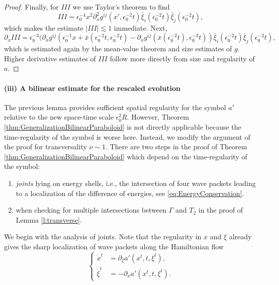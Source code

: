 \documentclass{amsart}
\theoremstyle{definition}
\begin{document}
\begin{proof}
Finally, for $III$ we use Taylor's theorem to find
\begin{equation*}
III = \epsilon_0^{-4} x^2 \partial^2_x g^{ij}(x',\epsilon_0^{-2}t ) \bar{\xi}_i(\epsilon_0^{-2} t) \bar{\xi}_j(\epsilon_0^{-2} t),
\end{equation*}
which makes the estimate $|III| \lesssim 1$ immediate. Next,
\begin{equation*}
\partial_x III = \epsilon_0^{-3} ( \partial_x g^{ij}(\epsilon_0^{-1} x + \bar{x}(\epsilon_0^{-2} t,\epsilon_0^{-2} t) - \partial_x g^{ij}(\bar{x}(\epsilon_0^{-2} t),\epsilon_0^{-2} t)) \bar{\xi}_i(\epsilon_0^{-2} t) \bar{\xi}_j(\epsilon_0^{-2} t),
\end{equation*}
which is estimated again by the mean-value theorem and size estimates of $g$. Higher derivative estimates of $III$ follow more directly from size and regularity of $a$.
\end{proof}

\smallskip

\paragraph{\textbf{(iii) A bilinear estimate for the rescaled evolution}}

The previous lemma provides sufficient spatial regularity for 
the symbol $a'$ relative to the new space-time scale  $\epsilon_0^2 R$. However,
 Theorem \ref{thm:GeneralizationBilinearParaboloid} is not directly applicable because the time-regularity of the symbol is worse here. Instead, we modify the argument of the proof for transversality $\nu \sim 1$.
 There are two steps in the proof of Theorem \ref{thm:GeneralizationBilinearParaboloid} which depend on the time-regularity of the symbol:
\begin{enumerate}
\item \emph{joints} lying on energy shells, i.e., the intersection of four wave packets leading to a localization of the difference of energies, see \eqref{eq:EnergyConservation}. 
\item when checking for multiple intersections between $\Gamma$ and $T_2$ in the proof of Lemma \ref{l:transverse}.
\end{enumerate}

We begin with the analysis of joints. Note that the regularity in $x$ and $\xi$ already gives the sharp localization of wave packets along the Hamiltonian flow
\begin{equation*}
\left\{ \begin{array}{cl}
\dot{x}^t &= \partial_{\xi} a'(x^t,t,\xi^t), \\
\dot{\xi}^t &= - \partial_x a'(x^t,t,\xi^t).
\end{array} \right.
\end{equation*}
\end{document}
